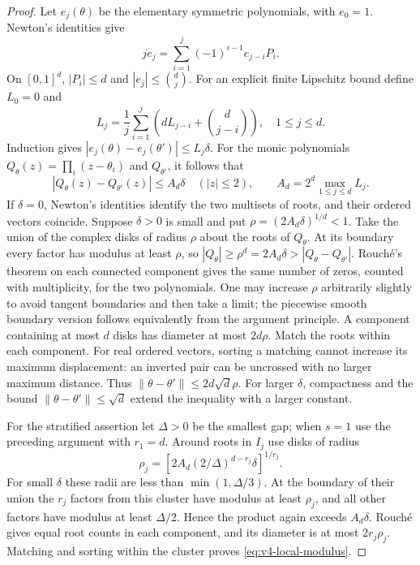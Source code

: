 \begin{proof}
Let $e_j(\theta)$ be the elementary symmetric polynomials, with
$e_0=1$. Newton's identities give
\[
 j e_j=\sum_{i=1}^j(-1)^{i-1}e_{j-i}P_i.
\]
On $[0,1]^d$, $|P_i|\le d$ and $|e_j|\le\binom dj$.
For an explicit finite Lipschitz bound define $L_0=0$ and
\[
 L_j=\frac1j\sum_{i=1}^j\left(dL_{j-i}+\binom d{j-i}\right),
 \quad 1\le j\le d.
\]
Induction gives $|e_j(\theta)-e_j(\theta')|\le L_j\delta$.
For the monic polynomials
$Q_\theta(z)=\prod_i(z-\theta_i)$ and $Q_{\theta'}$, it follows that
\begin{equation}
 |Q_\theta(z)-Q_{\theta'}(z)|\le A_d\delta\quad(|z|\le2),
 \qquad A_d=2^d\max_{1\le j\le d}L_j.                           \label{eq:v4-polynomial-perturbation}
\end{equation}
If $\delta=0$, Newton's identities identify the two multisets of roots,
and their ordered vectors coincide. Suppose $\delta>0$ is small and
put $\rho=(2A_d\delta)^{1/d}<1$. Take the union of the complex disks
of radius $\rho$ about the roots of $Q_\theta$. At its boundary every
factor has modulus at least $\rho$, so
$|Q_\theta|\ge\rho^d=2A_d\delta>|Q_\theta-Q_{\theta'}|$.
Rouch\'e's theorem on each connected component gives the same number
of zeros, counted with multiplicity, for the two polynomials.
One may increase $\rho$ arbitrarily slightly to avoid tangent
boundaries and then take a limit; the piecewise smooth boundary
version follows equivalently from the argument principle.
A component containing at most $d$ disks has diameter at most
$2d\rho$. Match the roots within each component. For real ordered
vectors, sorting a matching cannot increase its maximum displacement:
an inverted pair can be uncrossed with no larger maximum distance.
Thus $\|\theta-\theta'\|\le2d\sqrt d\rho$. For larger $\delta$,
compactness and the bound $\|\theta-\theta'\|\le\sqrt d$ extend the
inequality with a larger constant.

For the stratified assertion let $\Delta>0$ be the smallest gap;
when $s=1$ use the preceding argument with $r_1=d$.
Around roots in $I_j$ use disks of radius
\[
 \rho_j=\left[2A_d(2/\Delta)^{d-r_j}\delta\right]^{1/r_j}.
\]
For small $\delta$ these radii are less than $\min(1,\Delta/3)$.
At the boundary of their union the $r_j$ factors from this cluster
have modulus at least $\rho_j$, and all other factors have modulus
at least $\Delta/2$. Hence the product again exceeds
$A_d\delta$. Rouch\'e gives equal root counts in each component, and
its diameter is at most $2r_j\rho_j$. Matching and sorting within
the cluster proves \eqref{eq:v4-local-modulus}.
\end{proof}

